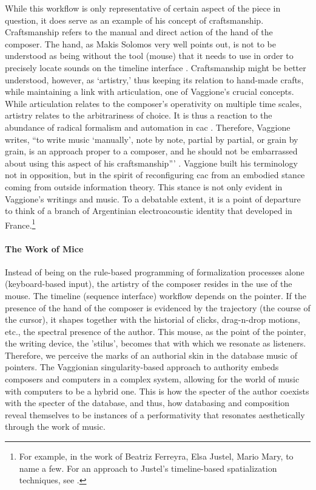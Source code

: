 While this workflow is only representative of certain aspect of the piece in question, it does serve as an example of his concept of craftsmanship. Craftsmanship refers to the manual and direct action of the hand of the composer. The hand, as Makis Solomos very well points out, is not to be understood as being without the tool (mouse) that it needs to use in order to precisely locate sounds on the timeline interface \parencite[4]{Sol05:AnI}. Craftsmanship might be better understood, however, as `artistry,' thus keeping its relation to hand-made crafts, while maintaining a link with articulation, one of Vaggione's crucial concepts. While articulation relates to the composer's operativity on multiple time scales, artistry relates to the arbitrariness of choice. It is thus a reaction to the abundance of radical formalism and automation in \gls{cac} \parencite[3]{Sol05:AnI}. Therefore, Vaggione writes, ``to write music `manually', note by note, partial by partial, or grain by grain, is an approach proper to a composer, and he should not be embarrassed about using this aspect of his craftsmanship''' \parencite[3]{Sol05:AnI}. Vaggione built his terminology not in opposition, but in the spirit of reconfiguring \gls{cac} from an embodied stance coming from outside information theory. This stance is not only evident in Vaggione's writings and music. To a debatable extent, it is a point of departure to think of a branch of Argentinian electroacoustic identity that developed in France.\footnote{For example, in the work of Beatriz Ferreyra, Elsa Justel, Mario Mary, to name a few. For an approach to Justel's timeline-based spatialization techniques, see \parencite{fdch/papers/elsa}.} 


\paragraph{The Work of Mice}
Instead of being on the rule-based programming of formalization processes alone (keyboard-based input), the artistry of the composer resides in the use of the mouse. The timeline (sequence interface) workflow depends on the pointer. If the presence of the hand of the composer is evidenced by the trajectory (the course of the cursor), it shapes together with the historial of clicks, drag-n-drop motions, etc., the spectral presence of the author. This mouse, as the point of the pointer, the writing device, the 'stilus', becomes that with which we resonate as listeners. Therefore, we perceive the marks of an authorial skin in the database music of pointers. The Vaggionian singularity-based approach to authority embeds composers and computers in a complex system, allowing for the world of music with computers to be a hybrid one. This is how the specter of the author coexists with the specter of the database, and thus, how databasing and composition reveal themselves to be instances of a performativity that resonates aesthetically through the work of music. 
